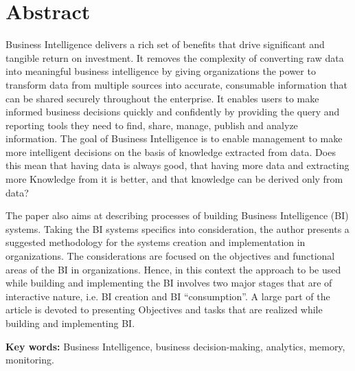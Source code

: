 \section{Abstract}

Business Intelligence delivers a rich set of benefits that drive significant and tangible return on investment. It removes the complexity of converting raw data into meaningful business intelligence by giving organizations the power to transform data from multiple sources into accurate, consumable information that can be shared securely throughout the enterprise. It enables users to make informed business decisions quickly and confidently by providing the query and reporting tools they need to find, share, manage, publish and analyze information. The goal of Business Intelligence is to enable management to make more intelligent decisions on the basis of knowledge extracted from data. Does this mean that having data is always good, that having more data and extracting more Knowledge from it is better, and that knowledge can be derived only from data?\newline

The paper also aims at describing processes of building Business Intelligence (BI) systems. Taking the BI systems specifics into consideration, the author presents a suggested methodology for the systems creation and implementation in organizations. The considerations are focused on the objectives and functional areas of the BI in organizations. Hence, in this context the approach to be used while building and implementing the BI involves two major stages that are of interactive nature, i.e. BI creation and BI “consumption”. A large part of the article is devoted to presenting Objectives and tasks that are realized while building and implementing BI.\newline

\textbf{Key words:} Business Intelligence, business decision-making, analytics, memory, monitoring.
